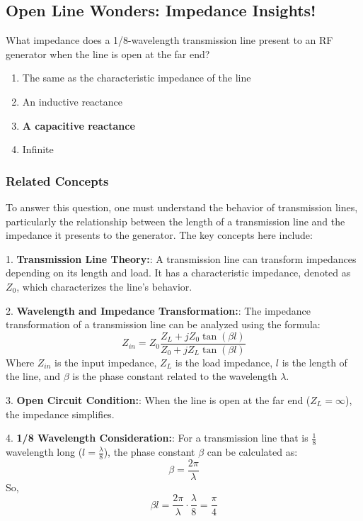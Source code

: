 \subsection{Open Line Wonders: Impedance Insights!}

\begin{tcolorbox}[colback=gray!10, colframe=black, title=E9F11] 

What impedance does a 1/8-wavelength transmission line present to an RF generator when the line is open at the far end?

\begin{enumerate}[label=\Alph*.]
    \item The same as the characteristic impedance of the line
    \item An inductive reactance
    \item \textbf{A capacitive reactance}
    \item Infinite
\end{enumerate} \end{tcolorbox}

\subsubsection{Related Concepts}

To answer this question, one must understand the behavior of transmission lines, particularly the relationship between the length of a transmission line and the impedance it presents to the generator. The key concepts here include:

1. \textbf{Transmission Line Theory:}: A transmission line can transform impedances depending on its length and load. It has a characteristic impedance, denoted as \(Z_0\), which characterizes the line's behavior.

2. \textbf{Wavelength and Impedance Transformation:}: The impedance transformation of a transmission line can be analyzed using the formula:
   \[
   Z_{in} = Z_0 \frac{Z_L + jZ_0 \tan(\beta l)}{Z_0 + jZ_L \tan(\beta l)}
   \]
   Where \(Z_{in}\) is the input impedance, \(Z_L\) is the load impedance, \(l\) is the length of the line, and \(\beta\) is the phase constant related to the wavelength \(\lambda\).

3. \textbf{Open Circuit Condition:}: When the line is open at the far end (\(Z_L = \infty\)), the impedance simplifies.

4. \textbf{1/8 Wavelength Consideration:}: For a transmission line that is \( \frac{1}{8} \) wavelength long (\(l = \frac{\lambda}{8}\)), the phase constant \(\beta\) can be calculated as:
   \[
   \beta = \frac{2\pi}{\lambda}
   \]
   So,
   \[
   \beta l = \frac{2\pi}{\lambda} \cdot \frac{\lambda}{8} = \frac{\pi}{4}
   \]

